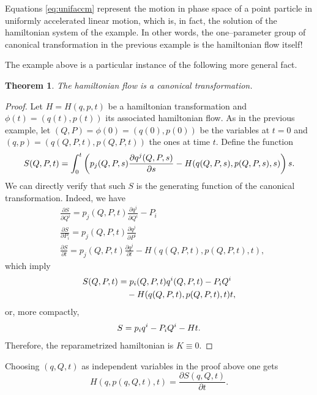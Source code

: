 \documentclass[english,fontsize=11pt,paper=a5,oneside]{scrbook}
\let\d\relax
\newcommand{\d}{\mathrm{d}}
\newtheorem{theorem}{Theorem}[chapter]
\theoremstyle{definition}
\newenvironment{remark}
  {\pushQED{\qed}\renewcommand{\qedsymbol}{$\lozenge$}\remarkx}
  {\popQED\endremarkx}
\begin{document}
Equations \eqref{eq:unifaccm} represent the motion in phase space of a point particle in uniformly accelerated linear motion, which is, in fact, the solution of the hamiltonian system of the example.
In other words, the one--parameter group of canonical transformation in the previous example is the hamiltonian flow itself!

The example above is a particular instance of the following more general fact.

\begin{theorem}
  The hamiltonian flow is a canonical transformation.
\end{theorem}
\begin{proof}
  Let $H = H(q,p,t)$ be a hamiltonian transformation and $\phi(t) = (q(t), p(t))$ its associated hamiltonian flow.
  As in the previous example, let $(Q, P) = \phi(0) = (q(0), p(0))$ be the variables at $t=0$ and $(q, p) = (q(Q,P,t), p(Q,P,t))$ the ones at time $t$. Define the function
  \begin{equation}
    S(Q,P,t) = \int_0^t\left(
    p_j(Q,P,s)\frac{\partial q^j(Q,P,s)}{\partial s} - H(q(Q,P,s), p(Q,P,s), s)
    \right)\d s.
  \end{equation}
  We can directly verify that such $S$ is the generating function of the canonical transformation. Indeed, we have
  \begin{align}
     & \frac{\partial S}{\partial Q^i} = p_j(Q,P,t) \frac{\partial q^j}{\partial Q^i} - P_i                   \\
     & \frac{\partial S}{\partial P_i} = p_j(Q,P,t) \frac{\partial q^j}{\partial P^i}                         \\
     & \frac{\partial S}{\partial t} = p_j(Q,P,t) \frac{\partial q^j}{\partial t} - H(q(Q,P,t), p(Q,P,t), t),
  \end{align}
  which imply
  \begin{align}
    \d S(Q, P, t) & = p_i(Q, P, t) \d q^i (Q, P, t) - P_i \d Q^i \\
                  & \quad - H(q(Q,P,t), p(Q,P,t), t) \d t,
  \end{align}
  or, more compactly,
  \begin{equation}
    \d S = p_i \d q^i - P_i \d Q^i - H \d t.
  \end{equation}
  Therefore, the reparametrized hamiltonian is $K\equiv 0$.
\end{proof}

\begin{remark}\label{rmk:genfnhamflowct}
  Choosing $(q,Q,t)$ as independent variables in the proof above one gets
  \begin{equation}
    H(q, p(q,Q,t), t) = \frac{\partial S(q,Q,t)}{\partial t}.
  \end{equation}
\end{remark}
\end{document}
